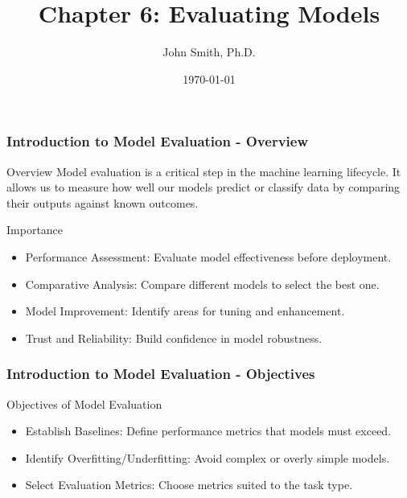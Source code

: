 \documentclass[aspectratio=169]{beamer}
\title{Chapter 6: Evaluating Models}
\author[J. Smith]{John Smith, Ph.D.}
\date{\today}
\begin{document}
\frame{\titlepage}

\begin{frame}[fragile]
    \frametitle{Introduction to Model Evaluation - Overview}
    \begin{block}{Overview}
        Model evaluation is a critical step in the machine learning lifecycle. It allows us to measure how well our models predict or classify data by comparing their outputs against known outcomes.
    \end{block}
    \begin{block}{Importance}
        \begin{itemize}
            \item Performance Assessment: Evaluate model effectiveness before deployment.
            \item Comparative Analysis: Compare different models to select the best one.
            \item Model Improvement: Identify areas for tuning and enhancement.
            \item Trust and Reliability: Build confidence in model robustness.
        \end{itemize}
    \end{block}
\end{frame}

\begin{frame}[fragile]
    \frametitle{Introduction to Model Evaluation - Objectives}
    \begin{block}{Objectives of Model Evaluation}
        \begin{itemize}
            \item Establish Baselines: Define performance metrics that models must exceed.
            \item Identify Overfitting/Underfitting: Avoid complex or overly simple models.
            \item Select Evaluation Metrics: Choose metrics suited to the task type.
        \end{itemize}
    \end{block}
\end{frame}
\end{document}
